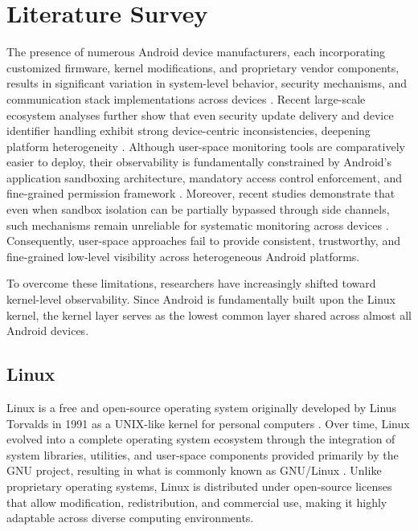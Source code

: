\documentclass{mnitjaipur}
\begin{document}
\clearpage
\chapter{Literature Survey}
The presence of numerous Android device manufacturers, each incorporating customized firmware, kernel modifications, and proprietary vendor components, results in significant variation in system-level behavior, security mechanisms, and communication stack implementations across devices \cite{bandara2025_oemtls,possemato2021_trustbutverify,hou2022_firmware,wen2024_vendor_blobs}. Recent large-scale ecosystem analyses further show that even security update delivery and device identifier handling exhibit strong device-centric inconsistencies, deepening platform heterogeneity \cite{acar2024_device_centric_updates,dong2025_nonresettable_ids,dong2024_device_specific_behaviors}. Although user-space monitoring tools are comparatively easier to deploy, their observability is fundamentally constrained by Android’s application sandboxing architecture, mandatory access control enforcement, and fine-grained permission framework \cite{mayrhofer2019_platform_security,rossi2021_seapp_mac}. Moreover, recent studies demonstrate that even when sandbox isolation can be partially bypassed through side channels, such mechanisms remain unreliable for systematic monitoring across devices \cite{lin2024_unprivileged_sidechannel}. Consequently, user-space approaches fail to provide consistent, trustworthy, and fine-grained low-level visibility across heterogeneous Android platforms.

\noindent
To overcome these limitations, researchers have increasingly shifted toward kernel-level observability. Since Android is fundamentally built upon the Linux kernel, the kernel layer serves as the lowest common layer shared across almost all Android devices.

\section{Linux}

Linux is a free and open-source operating system originally developed by Linus Torvalds in 1991 as a UNIX-like kernel for personal computers \cite{torvalds1991linux}. Over time, Linux evolved into a complete operating system ecosystem through the integration of system libraries, utilities, and user-space components provided primarily by the GNU project, resulting in what is commonly known as GNU/Linux \cite{stallman2002gnu}. Unlike proprietary operating systems, Linux is distributed under open-source licenses that allow modification, redistribution, and commercial use, making it highly adaptable across diverse computing environments.
\end{document}
